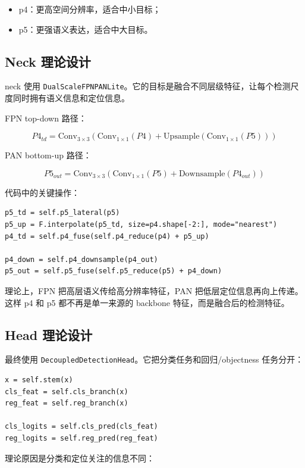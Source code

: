 \documentclass[11pt,a4paper]{article}
\newcommand{\code}[1]{\texttt{#1}}
\begin{document}
\begin{itemize}
  \item p4：更高空间分辨率，适合中小目标；
  \item p5：更强语义表达，适合中大目标。
\end{itemize}

\subsection{Neck 理论设计}

neck 使用 \code{DualScaleFPNPANLite}。它的目标是融合不同层级特征，让每个检测尺度同时拥有语义信息和定位信息。

FPN top-down 路径：

\[
P4_{td} = \text{Conv}_{3\times3}\left(\text{Conv}_{1\times1}(P4) + \text{Upsample}(\text{Conv}_{1\times1}(P5))\right)
\]

PAN bottom-up 路径：

\[
P5_{out} = \text{Conv}_{3\times3}\left(\text{Conv}_{1\times1}(P5) + \text{Downsample}(P4_{out})\right)
\]

代码中的关键操作：

\begin{Verbatim}[fontsize=\small]
p5_td = self.p5_lateral(p5)
p5_up = F.interpolate(p5_td, size=p4.shape[-2:], mode="nearest")
p4_td = self.p4_fuse(self.p4_reduce(p4) + p5_up)

p4_down = self.p4_downsample(p4_out)
p5_out = self.p5_fuse(self.p5_reduce(p5) + p4_down)
\end{Verbatim}

理论上，FPN 把高层语义传给高分辨率特征，PAN 把低层定位信息再向上传递。这样 p4 和 p5 都不再是单一来源的 backbone 特征，而是融合后的检测特征。

\subsection{Head 理论设计}

最终使用 \code{DecoupledDetectionHead}。它把分类任务和回归/objectness 任务分开：

\begin{Verbatim}[fontsize=\small]
x = self.stem(x)
cls_feat = self.cls_branch(x)
reg_feat = self.reg_branch(x)

cls_logits = self.cls_pred(cls_feat)
reg_logits = self.reg_pred(reg_feat)
\end{Verbatim}

理论原因是分类和定位关注的信息不同：
\end{document}
